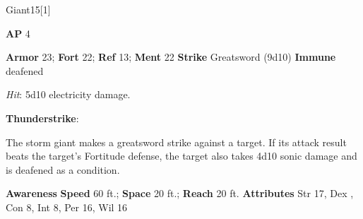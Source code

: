 \begin{monsection}[Storm]{Giant}{15}[1]
\vspace{-1em}\vspace{-1em}
\begin{spellcontent}
\begin{spelltargetinginfo}
{\textbf{AP} 4}

\pari \textbf{Armor} 23;
\textbf{Fort} 22;
\textbf{Ref} 13;
\textbf{Ment} 22
\pari \textbf{Strike} Greatsword  (9d10)
\pari \textbf{Immune} deafened


\end{spelltargetinginfo}


\begin{spelleffects}

\pari

\par


\par \textit{Hit}: 5d10 electricity damage.


\vspace{0.5em}
\pari
\textbf{Thunderstrike}:

The storm giant makes a greatsword strike against a target.
If its attack result beats the target's Fortitude defense,
the target also takes 4d10 sonic damage
and is deafened as a condition.




\end{spelleffects}

\end{spellcontent}

\begin{monsterfooter}
\pari \textbf{Awareness} 
\pari \textbf{Speed} 60 ft.;
\textbf{Space} 20 ft.;
\textbf{Reach} 20 ft.
\pari \textbf{Attributes}
Str 17,
Dex ,
Con 8,
Int 8,
Per 16,
Wil 16
\end{monsterfooter}
\end{monsection}



